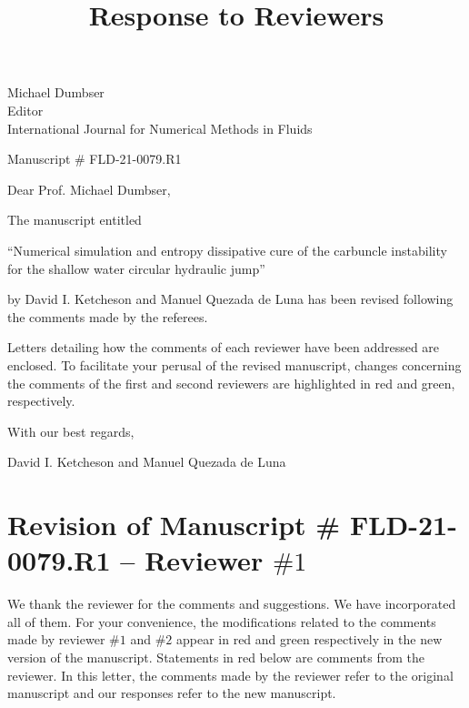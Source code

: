 \documentclass[english,11pt]{article}
\begin{document}
\title{Response to Reviewers}
\maketitle

\vspace{1.5cm}
\noindent
Michael Dumbser \\
Editor \\
International Journal for Numerical Methods in Fluids \\

\vspace{1.5cm}

\noindent
Manuscript \# FLD-21-0079.R1
\vspace{1.5cm}

\noindent
Dear Prof. Michael Dumbser,

\vspace{0.25cm}
\bigskip
The manuscript entitled
\begin{center}
``Numerical simulation and entropy dissipative cure of the carbuncle instability for the shallow water circular hydraulic jump''
\end{center}
by David I. Ketcheson and Manuel Quezada de Luna
has been revised following the comments made by the referees.

\bigskip
Letters detailing how the comments of each reviewer have been
addressed are enclosed. To facilitate your perusal of the revised
manuscript, changes concerning the comments of the first and second
reviewers are highlighted in red and green, respectively.


\vspace{0.25cm}
\bigskip\noindent 
With our best regards,

\vspace{0.5cm}
\bigskip\noindent
David I. Ketcheson and Manuel Quezada de Luna

\newpage
\section*{Revision of Manuscript \# FLD-21-0079.R1 -- Reviewer $\#1$}
We thank the reviewer for the comments and suggestions.
We have incorporated all of them.  For your convenience,
the modifications related to the comments made by reviewer $\#1$ and $\#2$
appear in red and green respectively in the new version of the manuscript. 
Statements in red below are comments from the reviewer.
In this letter, the comments made by the reviewer refer to the original
manuscript and our responses refer to the new manuscript. 
\end{document}

